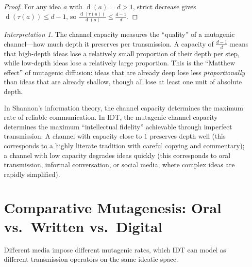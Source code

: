 \documentclass[11pt,openany]{book}
\theoremstyle{definition}
\theoremstyle{plain}
\theoremstyle{remark}
\newtheorem{interpretation}[axiom]{Interpretation}
\newcommand{\depth}{\operatorname{d}}       %
\newcommand{\transmit}{\tau}                 %
\begin{document}
\begin{proof}
For any idea $a$ with $\depth(a) = d > 1$, strict decrease gives $\depth(\transmit(a)) \leq d - 1$, so $\frac{\depth(\transmit(a))}{\depth(a)} \leq \frac{d-1}{d}$.
\end{proof}

\begin{interpretation}
The channel capacity measures the ``quality'' of a mutagenic channel---how much depth it preserves per transmission. A capacity of $\frac{d-1}{d}$ means that high-depth ideas lose a relatively small proportion of their depth per step, while low-depth ideas lose a relatively large proportion. This is the ``Matthew effect'' of mutagenic diffusion: ideas that are already deep lose less \emph{proportionally} than ideas that are already shallow, though all lose at least one unit of absolute depth.

In Shannon's information theory, the channel capacity determines the maximum rate of reliable communication. In IDT, the mutagenic channel capacity determines the maximum ``intellectual fidelity'' achievable through imperfect transmission. A channel with capacity close to 1 preserves depth well (this corresponds to a highly literate tradition with careful copying and commentary); a channel with low capacity degrades ideas quickly (this corresponds to oral transmission, informal conversation, or social media, where complex ideas are rapidly simplified).
\end{interpretation}

\section{Comparative Mutagenesis: Oral vs.\ Written vs.\ Digital}

Different media impose different mutagenic rates, which IDT can model as different transmission operators on the same ideatic space.
\end{document}
